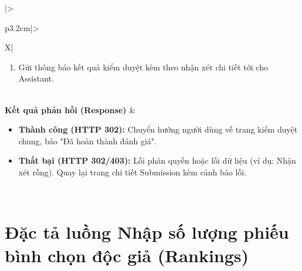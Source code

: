 \begin{table}[H]
\begin{tabularx}{\textwidth}{|>{\raggedright\arraybackslash\bfseries}p{3.2cm}|>{\raggedright\arraybackslash}X|}
\begin{minipage}[t]{\linewidth}
\begin{enumerate}[leftmargin=*]
\begin{itemize}
            \end{itemize}
        \item Gửi thông báo kết quả kiểm duyệt kèm theo nhận xét chi tiết tới cho Assistant.
    \end{enumerate}
\end{minipage} \\ \hline
\textbf{Kết quả phản hồi (Response)} & 
\begin{minipage}[t]{\linewidth}
    \begin{itemize}[leftmargin=*]
        \item \textbf{Thành công (HTTP 302):} Chuyển hướng người dùng về trang kiểm duyệt chung, báo "Đã hoàn thành đánh giá".
        \item \textbf{Thất bại (HTTP 302/403):} Lỗi phân quyền hoặc lỗi dữ liệu (ví dụ: Nhận xét rỗng). Quay lại trang chi tiết Submission kèm cảnh báo lỗi.
    \end{itemize}
\end{minipage} \\ \hline
\end{tabularx}
\caption{Đặc tả yêu cầu đánh giá và phê duyệt bản thảo}
\label{tab:api_review_store}
\end{table}

\newpage

\section{Đặc tả luồng Nhập số lượng phiếu bình chọn độc giả (Rankings)}
\label{sec:api_ranking_store}

